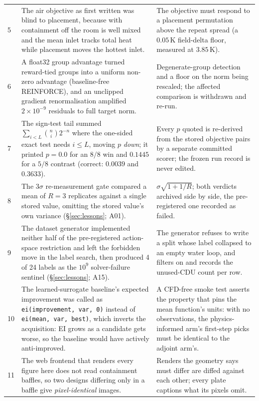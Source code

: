 \documentclass{article}
\begin{document}
\begin{table}[p]
\begin{tabular}{@{}p{0.6cm}p{7.3cm}p{7.3cm}@{}}
5 & The air objective as first written was blind to placement, because with containment off the room is well mixed and the mean inlet tracks total heat while placement moves the hottest inlet. & The objective must respond to a placement permutation above the repeat spread (a $0.05$\,K field-delta floor, measured at $3.85$\,K). \\
6 & A float32 group advantage turned reward-tied groups into a uniform non-zero advantage (baseline-free REINFORCE), and an unclipped gradient renormalisation amplified $2\times10^{-9}$ residuals to full target norm. & Degenerate-group detection and a floor on the norm being rescaled; the affected comparison is withdrawn and re-run. \\
7 & The sign-test tail summed $\sum_{i<L}\binom{n}{i}2^{-n}$ where the one-sided exact test needs $i\le L$, moving $p$ \emph{down}; it printed $p=0.0$ for an $8/8$ win and $0.1445$ for a $5/8$ contrast (correct: $0.0039$ and $0.3633$). & Every $p$ quoted is re-derived from the stored objective pairs by a separate committed scorer; the frozen run record is never edited. \\
8 & The $3\sigma$ re-measurement gate compared a mean of $R=3$ replicates against a single stored value, omitting the stored value's own variance (\S\ref{sec:lessons}; A01). & $\sigma\sqrt{1+1/R}$; both verdicts archived side by side, the pre-registered one recorded as failed. \\
9 & The dataset generator implemented neither half of the pre-registered action-space restriction and left the forbidden move in the label search, then produced 4 of 24 labels as the $10^9$ solver-failure sentinel (\S\ref{sec:lessons}; A15). & The generator refuses to write a split whose label collapsed to an empty water loop, and filters on and records the unused-CDU count per row. \\
10 & The learned-surrogate baseline's expected improvement was called as \texttt{ei(improvement, var, 0)} instead of \texttt{ei(mean, var, best)}, which inverts the acquisition: EI grows as a candidate gets worse, so the baseline would have actively anti-improved. & A CFD-free smoke test asserts the property that pins the mean function's units: with no observations, the physics-informed arm's first-step picks must be identical to the adjoint arm's. \\
11 & The web frontend that renders every figure here does not read containment baffles, so two designs differing only in a baffle give \emph{pixel-identical} images. & Renders the geometry says must differ are diffed against each other; every plate captions what its pixels omit. \\

\end{tabular}
\end{table}
\end{document}
